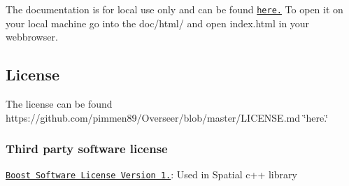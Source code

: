 The documentation is for local use only and can be found \href{https://github.com/pimmen89/Overseer/tree/master/doc}{\tt here.} To open it on your local machine go into the doc/html/ and open index.\+html in your webbrowser.

\subsection*{License}

The license can be found https\+://github.com/pimmen89/\+Overseer/blob/master/\+L\+I\+C\+E\+N\+S\+E.\+md \char`\"{}here.\char`\"{}

\subsubsection*{Third party software license}


\begin{DoxyItemize}
\item \href{http://www.boost.org/LICENSE_1_0.txt}{\tt Boost Software License Version 1.}\+: Used in Spatial c++ library 
\end{DoxyItemize}